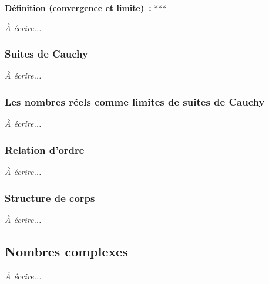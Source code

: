 \noindent\textbf{Définition (convergence et limite) :} ***

\emph{À écrire...}

\subsubsection{Suites de Cauchy}

\emph{À écrire...}

\subsubsection{Les nombres réels comme limites de suites de Cauchy}

\emph{À écrire...}

\subsubsection{Relation d'ordre}

\emph{À écrire...}

\subsubsection{Structure de corps}

\emph{À écrire...}

\subsection{Nombres complexes}

\emph{À écrire...}
